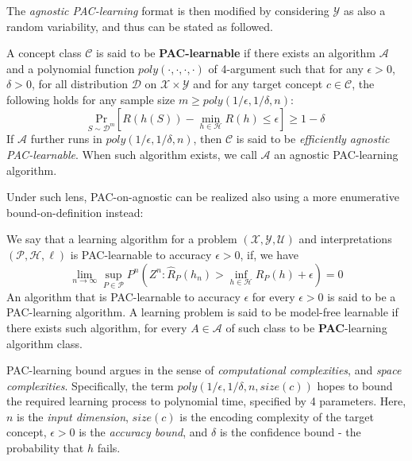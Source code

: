 The \textit{agnostic PAC-learning} format is then modified by considering $\mathcal{Y}$ as also a random variability, and thus can be stated as followed.
\begin{definition}
    A concept class $\mathcal{C}$ is said to be \textbf{PAC-learnable} if there exists an algorithm $\mathcal{A}$ and a polynomial function $poly(\cdot,\cdot,\cdot,\cdot)$ of 4-argument such that for any $\epsilon>0$, $\delta>0$, for all distribution $\mathcal{D}$  on $\mathcal{X}\times \mathcal{Y}$ and for any target concept $c\in\mathcal{C}$, the following holds for any sample size $m\geq poly(1/\epsilon,1/\delta,n)$:
    \begin{equation}
        \underset{S\sim \mathcal{D}^{m}}{\mathrm{Pr}}\left[ R(h(S))- \min_{h\in\mathcal{H}}R(h)\leq \epsilon \right]\geq 1-\delta
    \end{equation}
    If $\mathcal{A}$ further runs in $poly(1/\epsilon,1/\delta,n)$, then $\mathcal{C}$ is said to be \textit{efficiently agnostic PAC-learnable}. When such algorithm exists, we call $\mathcal{A}$ an agnostic PAC-learning algorithm.
\end{definition}

Under such lens, PAC-on-agnostic can be realized also using a more enumerative bound-on-definition instead: 
\begin{definition}
    We say that a learning algorithm for a problem $(\mathcal{X},\mathcal{Y},\mathcal{U})$ and interpretations $(\mathcal{P},\mathcal{H},\ell)$ is PAC-learnable to accuracy $\epsilon > 0$, if, we have 
    \begin{equation}
        \lim_{n\to \infty}\sup_{P\in \mathcal{P}} P^{n} \left(Z^n : \hat{R}_{P}(h_{n})>\inf_{h\in\mathcal{H}} R_{P}(h)+\epsilon\right) = 0
    \end{equation}
    An algorithm that is PAC-learnable to accuracy $\epsilon$ for every $\epsilon >0$ is said to be a PAC-learning algorithm. A learning problem is said to be model-free learnable if there exists such algorithm, for every $A\in\mathcal{A}$ of such class to be \textbf{PAC}-learning algorithm class. 
\end{definition}

PAC-learning bound argues in the sense of \textit{computational complexities}, and \textit{space complexities}. Specifically, the term $poly(1/\epsilon,1/\delta,n,size(c))$ hopes to bound the required learning process to polynomial time, specified by 4 parameters. Here, $n$ is the \textit{input dimension}, $size(c)$ is the encoding complexity of the target concept, $\epsilon>0$ is the \textit{accuracy bound}, and $\delta$ is the confidence bound - the probability that $h$ fails.

